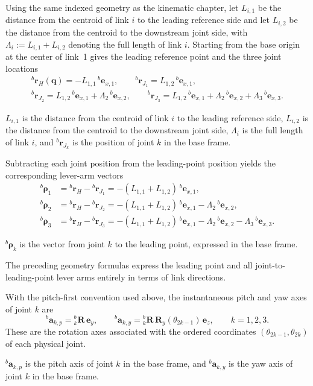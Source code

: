 \documentclass[12pt,a4paper]{report}
\newcommand{\newsymbols}[1]{\par\noindent{}#1\par\vspace{0.35em}}
\newcommand{\formulaannotation}[1]{\par\noindent{}#1\par\vspace{0.35em}}
\begin{document}
Using the same indexed geometry as the kinematic chapter, let $L_{i,1}$ be the distance from the centroid of link $i$ to the leading reference side and let $L_{i,2}$ be the distance from the centroid to the downstream joint side, with $\Lambda_i := L_{i,1}+L_{i,2}$ denoting the full length of link $i$. Starting from the base origin at the center of link~1 gives the leading reference point and the three joint locations
\begin{equation}
\begin{aligned}
{}^{b}\mathbf{r}_H(\mathbf{q}) =
-L_{1,1}\,{}^{b}\mathbf{e}_{x,1},
\qquad
{}^{b}\mathbf{r}_{J_1} = L_{1,2}\,{}^{b}\mathbf{e}_{x,1},
\\
{}^{b}\mathbf{r}_{J_2} = L_{1,2}\,{}^{b}\mathbf{e}_{x,1} + \Lambda_2\,{}^{b}\mathbf{e}_{x,2},
\qquad
{}^{b}\mathbf{r}_{J_3} = L_{1,2}\,{}^{b}\mathbf{e}_{x,1} + \Lambda_2\,{}^{b}\mathbf{e}_{x,2} + \Lambda_3\,{}^{b}\mathbf{e}_{x,3}.
\end{aligned}
\end{equation}
\newsymbols{$L_{i,1}$ is the distance from the centroid of link $i$ to the leading reference side, $L_{i,2}$ is the distance from the centroid to the downstream joint side, $\Lambda_i$ is the full length of link $i$, and ${}^{b}\mathbf{r}_{J_k}$ is the position of joint $k$ in the base frame.}

Subtracting each joint position from the leading-point position yields the corresponding lever-arm vectors
\begin{equation}
\begin{aligned}
{}^{b}\boldsymbol{\rho}_1
&= {}^{b}\mathbf{r}_H - {}^{b}\mathbf{r}_{J_1}
= -(L_{1,1}+L_{1,2})\,{}^{b}\mathbf{e}_{x,1}, \\
{}^{b}\boldsymbol{\rho}_2
&= {}^{b}\mathbf{r}_H - {}^{b}\mathbf{r}_{J_2}
= -(L_{1,1}+L_{1,2})\,{}^{b}\mathbf{e}_{x,1} - \Lambda_2\,{}^{b}\mathbf{e}_{x,2}, \\
{}^{b}\boldsymbol{\rho}_3
&= {}^{b}\mathbf{r}_H - {}^{b}\mathbf{r}_{J_3}
= -(L_{1,1}+L_{1,2})\,{}^{b}\mathbf{e}_{x,1} - \Lambda_2\,{}^{b}\mathbf{e}_{x,2} - \Lambda_3\,{}^{b}\mathbf{e}_{x,3}.
\end{aligned}
\end{equation}
\newsymbols{${}^{b}\boldsymbol{\rho}_k$ is the vector from joint $k$ to the leading point, expressed in the base frame.}
\formulaannotation{The preceding geometry formulas express the leading point and all joint-to-leading-point lever arms entirely in terms of link directions.}

With the pitch-first convention used above, the instantaneous pitch and yaw axes of joint $k$ are
\begin{equation}
{}^{b}\mathbf{a}_{k,p} = {}_{k}^{b}\mathbf{R}\,\mathbf{e}_y,
\qquad
{}^{b}\mathbf{a}_{k,y} = {}_{k}^{b}\mathbf{R}\,\mathbf{R}_{y}(\theta_{2k-1})\,\mathbf{e}_z,
\qquad
k = 1,2,3.
\end{equation}
These are the rotation axes associated with the ordered coordinates $(\theta_{2k-1},\theta_{2k})$ of each physical joint.
\newsymbols{${}^{b}\mathbf{a}_{k,p}$ is the pitch axis of joint $k$ in the base frame, and ${}^{b}\mathbf{a}_{k,y}$ is the yaw axis of joint $k$ in the base frame.}
\end{document}
